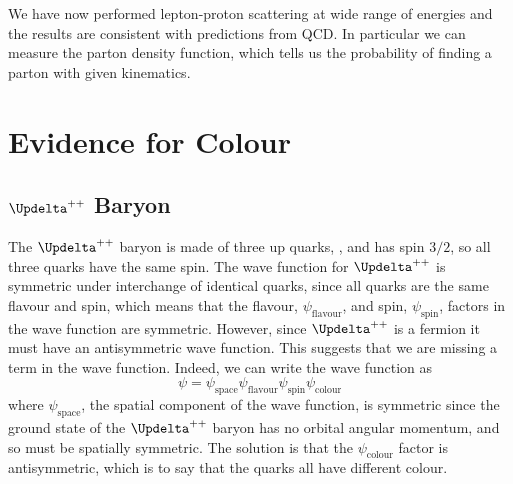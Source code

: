 \documentclass[fleqn]{NotesClass}
\makeatletter
\newcommand{\PBASE@Delta}{\Updelta}
\newcommand{\PDeltapp}{\ensuremath{\PBASE@Delta^{++}}}
\makeatother
\begin{document}
    We have now performed lepton-proton scattering at wide range of energies and the results are consistent with predictions from QCD.
    In particular we can measure the parton density function, which tells us the probability of finding a parton with given kinematics.
    
    \section{Evidence for Colour}
    \subsection{\PDeltapp{} Baryon}
    The \PDeltapp{} baryon is made of three up quarks, \Pu\Pu\Pu, and has spin \(3/2\), so all three quarks have the same spin.
    The wave function for \PDeltapp{} is symmetric under interchange of identical quarks, since all quarks are the same flavour and spin, which means that the flavour, \(\psi_{\text{flavour}}\), and spin, \(\psi_{\text{spin}}\), factors in the wave function are symmetric.
    However, since \PDeltapp{} is a fermion it must have an antisymmetric wave function.
    This suggests that we are missing a term in the wave function.
    Indeed, we can write the wave function as
    \begin{equation}
        \psi = \psi_{\text{space}}\psi_{\mathrm{flavour}}\psi_{\mathrm{spin}}\psi_{\text{colour}}
    \end{equation}
    where \(\psi_{\text{space}}\), the spatial component of the wave function, is symmetric since the ground state of the \PDeltapp{} baryon has no orbital angular momentum, and so must be spatially symmetric.
    The solution is that the \(\psi_{\text{colour}}\) factor is antisymmetric, which is to say that the quarks all have different colour.
    
\end{document}

